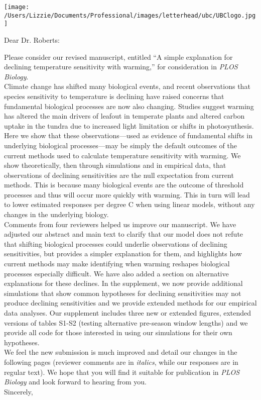 \documentclass[11pt,a4paper]{letter}
\begin{document}
\begin{letter}{}
\texttt{[image: /Users/Lizzie/Documents/Professional/images/letterhead/ubc/UBClogo.jpg]}\\
\opening{Dear Dr. Roberts:}
Please consider our revised manuscript, entitled ``A simple explanation for declining temperature sensitivity with warming,'' for consideration in \emph{PLOS Biology}.
\vspace{1.5ex}\\
Climate change has shifted many biological events, and recent observations that species sensitivity to temperature is declining have raised concerns that fundamental biological processes are now also changing. Studies suggest warming has altered the main drivers of leafout in temperate plants and altered carbon uptake in the tundra due to increased light limitation or shifts in photosynthesis.
\vspace{1.5ex}\\
Here we show that these observations---used as evidence of fundamental shifts in underlying biological processes---may be simply the default outcomes of the current methods used to calculate temperature sensitivity with warming. We show theoretically, then through simulations and in empirical data, that observations of declining sensitivities are the null expectation from current methods. This is because many biological events are the outcome of threshold processes and thus will occur more quickly with warming. This in turn will lead to lower estimated responses per degree C when using linear models, without any changes in the underlying biology. 
\vspace{1.5ex}\\
Comments from four reviewers helped us improve our manuscript. We have adjusted our abstract and main text to clarify that our model does not refute that shifting biological processes could underlie observations of declining sensitivities, but provides a simpler explanation for them, and highlights how current methods may make identifying when warming reshapes biological processes especially difficult. We have also added a section on alternative explanations for these declines. In the supplement, we now provide additional simulations that show common hypotheses for declining sensitivities may not produce declining sensitivities and we provide extended methods for our empirical data analyses. Our supplement includes three new or extended figures, extended versions of tables S1-S2 (testing alternative pre-season window lengths) and we provide all code for those interested in using our simulations for their own hypotheses. 
\vspace{1.5ex}\\
We feel the new submission is much improved and detail our changes in the following pages (reviewer comments are in \emph{italics}, while our responses are in regular text). We hope that you will find it suitable for publication in \emph{PLOS Biology} and look forward to hearing from you.
\vspace{1.5ex}\\
Sincerely,\\


\end{letter}
\end{document}
